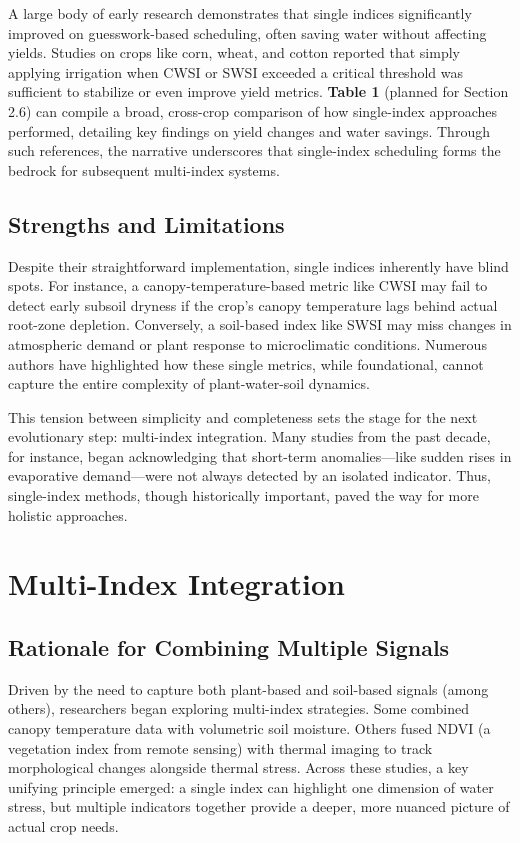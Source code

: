 \documentclass[12pt]{article}
\begin{document}
A large body of early research demonstrates that single indices significantly improved on guesswork-based scheduling, often saving water without affecting yields. Studies on crops like corn, wheat, and cotton reported that simply applying irrigation when CWSI or SWSI exceeded a critical threshold was sufficient to stabilize or even improve yield metrics. \textbf{Table 1} (planned for Section 2.6) can compile a broad, cross-crop comparison of how single-index approaches performed, detailing key findings on yield changes and water savings. Through such references, the narrative underscores that single-index scheduling forms the bedrock for subsequent multi-index systems.

\subsection{Strengths and Limitations}
Despite their straightforward implementation, single indices inherently have blind spots. For instance, a canopy-temperature-based metric like CWSI may fail to detect early subsoil dryness if the crop’s canopy temperature lags behind actual root-zone depletion. Conversely, a soil-based index like SWSI may miss changes in atmospheric demand or plant response to microclimatic conditions. Numerous authors have highlighted how these single metrics, while foundational, cannot capture the entire complexity of plant-water-soil dynamics.

This tension between simplicity and completeness sets the stage for the next evolutionary step: multi-index integration. Many studies from the past decade, for instance, began acknowledging that short-term anomalies—like sudden rises in evaporative demand—were not always detected by an isolated indicator. Thus, single-index methods, though historically important, paved the way for more holistic approaches.



\section{Multi-Index Integration}

\subsection{Rationale for Combining Multiple Signals}
Driven by the need to capture both plant-based and soil-based signals (among others), researchers began exploring multi-index strategies. Some combined canopy temperature data with volumetric soil moisture. Others fused NDVI (a vegetation index from remote sensing) with thermal imaging to track morphological changes alongside thermal stress. Across these studies, a key unifying principle emerged: a single index can highlight one dimension of water stress, but multiple indicators together provide a deeper, more nuanced picture of actual crop needs.
\end{document}

